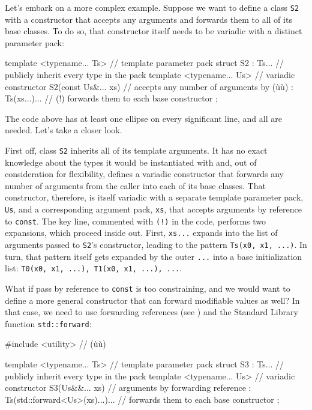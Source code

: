 Let's embark on a more complex example. Suppose we want to define a
class \lstinline!S2! with a constructor that accepts any arguments and
forwards them to all of its base classes. To do so, that constructor
itself needs to be variadic with a distinct parameter pack:

\begin{emcppslisting}[emcppsbatch=e29]
template <typename... Ts>      // template parameter pack
struct S2 : Ts...              // publicly inherit every type in the pack
{
    template <typename... Us>  // variadic constructor
    S2(const Us&... xs)        // accepts any number of arguments by (ù{}ù)
    : Ts(xs...)...             // (!) forwards them to each base constructor
    { }
};
\end{emcppslisting}
    

\noindent The code above has at least one ellipse on every significant line, and
all are needed. Let's take a closer look.

First off, class \lstinline!S2! inherits all of its template arguments. It
has no exact knowledge about the types it would be instantiated with
and, out of consideration for flexibility, defines a variadic
constructor that forwards any number of arguments from the caller into
each of its base classes. That constructor, therefore, is itself
variadic with a separate template parameter pack, \lstinline!Us!, and a
corresponding argument pack, \lstinline!xs!, that accepts arguments by
reference to \lstinline!const!. The key line, commented with \lstinline|(!)|
in the code, performs two expansions, which proceed inside out. First,
\lstinline!xs...! expands into the list of arguments passed to
\lstinline!S2!'s constructor, leading to the pattern
\lstinline!Ts(x0,!~\lstinline!x1,!~\lstinline!...)!. In turn, that pattern itself
gets expanded by the outer \lstinline!...! into a base initialization list:
\lstinline!T0(x0,!~\lstinline!x1,!~\lstinline!...),!~\lstinline!T1(x0,!~\lstinline!x1,!~\lstinline!...),!~\lstinline!...!.

What if pass by reference to \lstinline!const! is too constraining, and we
would want to define a more general constructor that can forward
modifiable values as well? In that case, we need to use forwarding
references (see ) and the Standard Library
function \lstinline!std::forward!:

\begin{emcppslisting}[emcppsbatch=e29]
#include <utility>  // (ù{}ù)

template <typename... Ts>      // template parameter pack
struct S3 : Ts...              // publicly inherit every type in the pack
{
    template <typename... Us>  // variadic constructor
    S3(Us&&... xs)             // arguments by forwarding reference
    : Ts(std::forward<Us>(xs)...)...
                               // forwards them to each base constructor
    { }
};
\end{emcppslisting}
    

